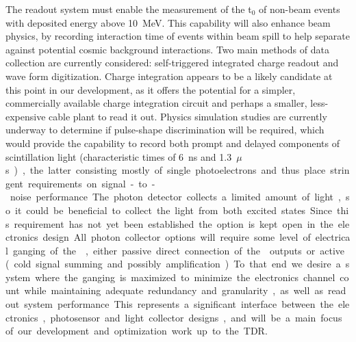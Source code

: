 The readout system must enable the measurement of the t$_0$ of non-beam events with deposited energy above \SI{10}{MeV}. 
This capability will also enhance beam physics, by recording interaction time of events within 
beam spill to help separate against potential cosmic background interactions. Two main methods of data collection are currently considered:  self-triggered integrated charge readout and wave form digitization.  Charge integration appears to be a likely candidate at this point in our development, as it offers the potential for a simpler, commercially available charge integration circuit and perhaps a smaller, less-expensive cable plant to read it out.  Physics simulation studies are currently underway to determine if pulse-shape discrimination will be required, which would provide the capability to record both prompt and delayed components of scintillation light (characteristic times of \SI{6}{ns} and \SI{1.3}{$\mu$s}), the latter consisting mostly of single photoelectrons and thus place stringent requirements on signal-to-noise performance. The photon detector collects a limited amount of light, so it could be beneficial to collect the light from both excited states. 
Since this requirement has not yet been established the option is kept open in the electronics design.

All photon collector options will require some level of electrical ganging of the , either passive direct connection of the  outputs or active (cold signal summing and possibly amplification).  To that end we desire a system where the ganging is maximized to minimize the electronics channel count while maintaining adequate redundancy and granularity, as well as readout system performance.  This represents a significant interface between the electronics, photosensor and light collector designs, and will be a main focus of our development and optimization work up to the TDR.


